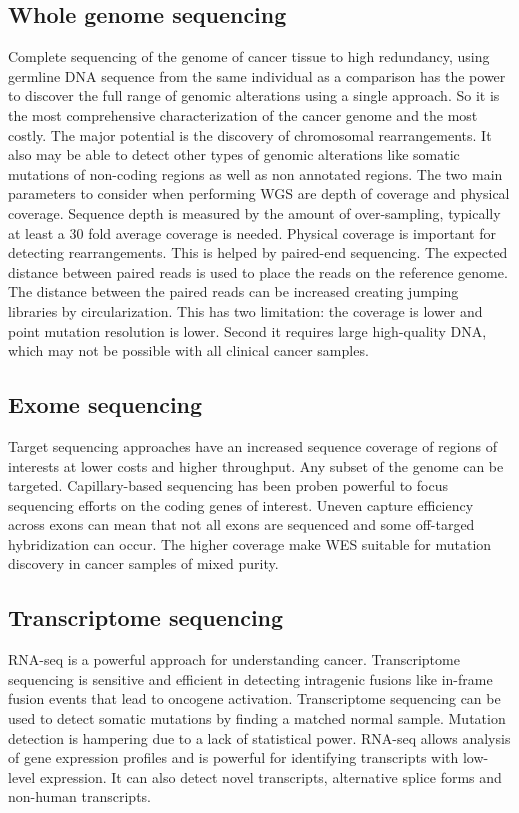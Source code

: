 	\subsection{Whole genome sequencing}
	Complete sequencing of the genome of cancer tissue to high redundancy, using germline DNA sequence from the same individual as a comparison has the power to discover the full range of genomic alterations using a single approach.
	So it is the most comprehensive characterization of the cancer genome and the most costly.
	The major potential is the discovery of chromosomal rearrangements.
	It also may be able to detect other types of genomic alterations like somatic mutations of non-coding regions as well as non annotated regions.
	The two main parameters to consider when performing WGS are depth of coverage and physical coverage.
	Sequence depth is measured by the amount of over-sampling, typically at least a $30$ fold average coverage is needed.
	Physical coverage is important for detecting rearrangements.
	This is helped by paired-end sequencing.
	The expected distance between paired reads is used to place the reads on the reference genome.
	The distance between the paired reads can be increased creating jumping libraries by circularization.
	This has two limitation: the coverage is lower and point mutation resolution is lower.
	Second it requires large high-quality DNA, which may not be possible with all clinical cancer samples.

	\subsection{Exome sequencing}
	Target sequencing approaches have an increased sequence coverage of regions of interests at lower costs and higher throughput.
	Any subset of the genome can be targeted.
	Capillary-based sequencing has been proben powerful to focus sequencing efforts on the coding genes of interest.
	Uneven capture efficiency across exons can mean that not all exons are sequenced and some off-targed hybridization can occur.
	The higher coverage make WES suitable for mutation discovery in cancer samples of mixed purity.

	\subsection{Transcriptome sequencing}
	RNA-seq is a powerful approach for understanding cancer.
	Transcriptome sequencing is sensitive and efficient in detecting intragenic fusions like in-frame fusion events that lead to oncogene activation.
	Transcriptome sequencing can be used to detect somatic mutations by finding a matched normal sample.
	Mutation detection is hampering due to a lack of statistical power.
	RNA-seq allows analysis of gene expression profiles and is powerful for identifying transcripts with low-level expression.
	It can also detect novel transcripts, alternative splice forms and non-human transcripts.

